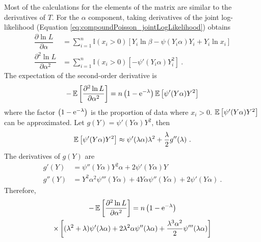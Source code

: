 Most of the calculations for the elements of the matrix are similar to the derivatives of $T$. For the $\alpha$ component, taking derivatives of the joint log-likelihood (Equation \eqref{eq:compoundPoisson_jointLogLikelihood}) obtains
\begin{align}
\dfrac{\partial\ln L}{\partial\alpha} &= \sum_{i=1}^n\mathbb{I}(x_i>0)
\left[
  Y_i\ln\beta - \psi(Y_i\alpha)Y_i+Y_i\ln x_i
\right]
\\
\dfrac{\partial^2\ln L}{\partial\alpha^2} &= \sum_{i=1}^n\mathbb{I}(x_i>0)
\left[
  -\psi'(Y_i\alpha)Y_i^2
\right] \ .
\end{align}
The expectation of the second-order derivative is
\begin{equation}
-\operatorname{\mathbb{E}}\left[\dfrac{\partial^2\ln L}{\partial\alpha^2}\right]
=
n\left(1-\mathrm{e}^{-\lambda}\right)
\operatorname{\mathbb{E}}\left[
  \psi'(Y\alpha)Y^2
\right]
\end{equation}
where the factor $\left(1-\mathrm{e}^{-\lambda}\right)$ is the proportion of data where $x_i>0$. $\operatorname{\mathbb{E}}\left[\psi'(Y\alpha)Y^2\right]$ can be approximated. Let $g(Y)=\psi'(Y\alpha)Y^2$, then
\begin{equation}
\operatorname{\mathbb{E}}\left[\psi'(Y\alpha)Y^2\right]
\approx
\psi'(\lambda\alpha)\lambda^2
+\dfrac{\lambda}{2}g''(\lambda) \ .
\end{equation}
The derivatives of $g(Y)$ are
\begin{align}
g'(Y)&=\psi''(Y\alpha)Y^2\alpha + 2\psi'(Y\alpha)Y
\\
g''(Y)&=Y^2\alpha^2\psi'''(Y\alpha)+4Y\alpha\psi''(Y\alpha)+2\psi'(Y\alpha)\ .
\end{align}
Therefore,
\begin{multline}
-\operatorname{\mathbb{E}}\left[\dfrac{\partial^2\ln L}{\partial\alpha^2}\right]=n\left(1-\mathrm{e}^{-\lambda}\right)
\\
\times\left[(\lambda^2+\lambda)\psi'(\lambda\alpha)+2\lambda^2\alpha\psi''(\lambda\alpha)+\dfrac{\lambda^3\alpha^2}{2}\psi'''(\lambda\alpha)\right]
\end{multline}

